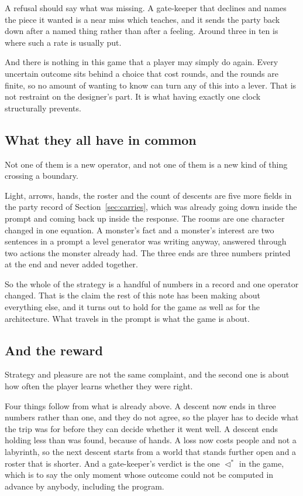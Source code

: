 \documentclass[11pt,a4paper]{article}
\newcommand{\seqb}{\lhd^{\ast}}
\begin{document}
A refusal should say what was missing. A gate-keeper that declines and names the piece it wanted is a
near miss which teaches, and it sends the party back down after a named thing rather than after a
feeling. Around three in ten is where such a rate is usually put.

\begin{alarmbox}
And there is nothing in this game that a player may simply do again. Every uncertain outcome sits
behind a choice that cost rounds, and the rounds are finite, so no amount of wanting to know can
turn any of this into a lever. That is not restraint on the designer's part. It is what having
exactly one clock structurally prevents.
\end{alarmbox}

\subsection{What they all have in common}

Not one of them is a new operator, and not one of them is a new kind of thing crossing a
boundary.

Light, arrows, hands, the roster and the count of descents are five more fields in the party
record of Section~\ref{sec:carries}, which was already going down inside the prompt and coming
back up inside the response. The rooms are one character changed in one equation. A monster's fact
and a monster's interest are two sentences in a prompt a level generator was writing anyway,
answered through two actions the monster already had. The three ends are three numbers printed at
the end and never added together.

\begin{sectionbox}
So the whole of the strategy is a handful of numbers in a record and one operator changed. That is
the claim the rest of this note has been making about everything else, and it turns out to hold
for the game as well as for the architecture. What travels in the prompt is what the game is
about.
\end{sectionbox}

\subsection{And the reward}

Strategy and pleasure are not the same complaint, and the second one is about how often the
player learns whether they were right.

Four things follow from what is already above. A descent now ends in three numbers rather than
one, and they do not agree, so the player has to decide what the trip was for before they can
decide whether it went well. A descent ends holding less than was found, because of hands. A loss
now costs people and not a labyrinth, so the next descent starts from a world that stands further
open and a roster that is shorter. And a gate-keeper's verdict is the one $\seqb$ in the game, which is
to say the only moment whose outcome could not be computed in advance by anybody, including the
program.
\end{document}
